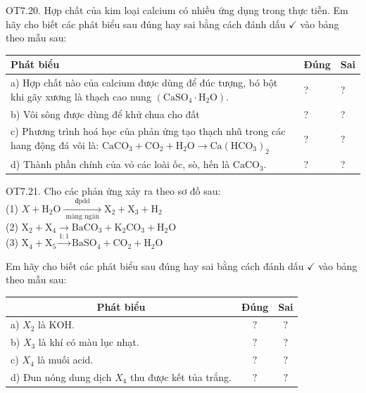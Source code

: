 \documentclass[10pt]{article}
\begin{document}
OT7.20. Hợp chất của kim loại calcium có nhiều ứng dụng trong thực tiễn. Em hãy cho biết các phát biểu sau đúng hay sai bằng cách đánh dấu $\checkmark$ vào bảng theo mẫu sau:

\begin{center}
\begin{tabular}{|l|l|l|}
\hline
Phát biểu & Đúng & Sai \\
\hline
a) Hợp chất nào của calcium được dùng để đúc tượng, bó bột khi gãy xương là thạch cao nung $\left(\mathrm{CaSO}_{4} \cdot \mathrm{H}_{2} \mathrm{O}\right)$. & ? & ? \\
\hline
b) Vôi sông được dùng để khử chua cho đất & ? & ? \\
\hline
c) Phương trình hoá học của phản ứng tạo thạch nhũ trong các hang động đá vôi là: $\mathrm{CaCO}_{3}+\mathrm{CO}_{2}+\mathrm{H}_{2} \mathrm{O} \rightarrow \mathrm{Ca}\left(\mathrm{HCO}_{3}\right)_{2}$ & ? & ? \\
\hline
d) Thành phần chính của vỏ các loài ốc, sò, hến là $\mathrm{CaCO}_{3}$. & ? & ? \\
\hline
\end{tabular}
\end{center}

OT7.21. Cho các phản ứng xảy ra theo sơ đồ sau:\\
(1) $X+\mathrm{H}_{2} \mathrm{O} \xrightarrow[\text { màng ngăn }]{\text { đpdd }} \mathrm{X}_{2}+\mathrm{X}_{3}+\mathrm{H}_{2}$\\
(2) $\mathrm{X}_{2}+\mathrm{X}_{4} \rightarrow \mathrm{BaCO}_{3}+\mathrm{K}_{2} \mathrm{CO}_{3}+\mathrm{H}_{2} \mathrm{O}$\\
(3) $\mathrm{X}_{4}+\mathrm{X}_{5} \xrightarrow{1: 1} \mathrm{BaSO}_{4}+\mathrm{CO}_{2}+\mathrm{H}_{2} \mathrm{O}$

Em hãy cho biết các phát biểu sau đúng hay sai bằng cách đánh dấu $\checkmark$ vào bảng theo mẫu sau:

\begin{center}
\begin{tabular}{|l|c|c|}
\hline
\multicolumn{1}{|c|}{Phát biểu} & Đúng & Sai \\
\hline
a) $X_{2}$ là KOH. & $?$ & $?$ \\
\hline
b) $X_{3}$ là khí có màu lục nhạt. & $?$ & $?$ \\
\hline
c) $X_{4}$ là muối acid. & $?$ & $?$ \\
\hline
d) Đun nóng dung dịch $X_{4}$ thu được kết tủa trắng. & $?$ & $?$ \\
\hline
\end{tabular}
\end{center}
\end{document}
